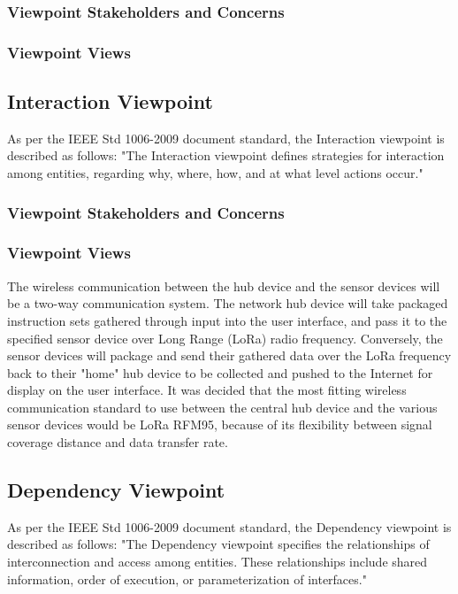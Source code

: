 \documentclass[onecolumn, draftclsnofoot,10pt, compsoc]{IEEEtran}
\newcounter{subsubsubsection}[subsubsection]
\begin{document}
        \subsubsection{Viewpoint Stakeholders and Concerns}
        \subsubsection{Viewpoint Views}
        
        \subsection{Interaction Viewpoint}
        As per the IEEE Std 1006-2009 document standard, the Interaction viewpoint is described as follows: "The Interaction viewpoint defines strategies for interaction among entities, regarding why, where, how, and at what level actions occur."
        \subsubsection{Viewpoint Stakeholders and Concerns}
        \subsubsection{Viewpoint Views}
        The wireless communication between the hub device and the sensor devices will be a two-way communication system.
        The network hub device will take packaged instruction sets gathered through input into the user interface, and pass it to the specified sensor device over Long Range (LoRa) radio frequency.
        Conversely, the sensor devices will package and send their gathered data over the LoRa frequency back to their "home" hub device to be collected and pushed to the Internet for display on the user interface.
        It was decided that the most fitting wireless communication standard to use between the central hub device and the various sensor devices would be LoRa RFM95, because of its flexibility between signal coverage distance and data transfer rate.\\
           
        \subsection{Dependency Viewpoint}
        As per the IEEE Std 1006-2009 document standard, the Dependency viewpoint is described as follows: "The Dependency viewpoint specifies
     the relationships of interconnection and access among entities. These relationships include shared information, order of execution, or parameterization of interfaces."
\end{document}
